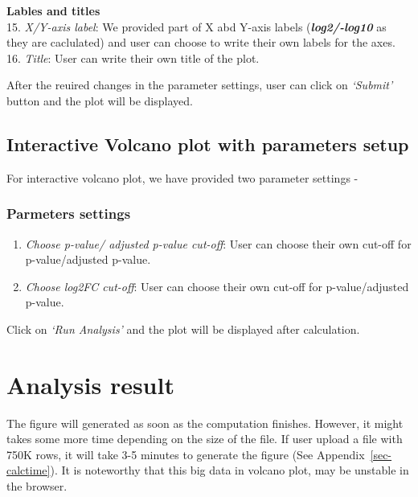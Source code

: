 \documentclass[
  a4paper,
  oneside,
  open=any]{scrreport}
\providecommand{\tightlist}{%
  \setlength{\itemsep}{0pt}\setlength{\parskip}{0pt}}\usepackage{longtable,booktabs,array}
\begin{document}
\textbf{Lables and titles}\\
15. \emph{X/Y-axis label}: We provided part of X abd Y-axis labels
(\textbf{\emph{log2/-log10}} as they are caclulated) and user can choose
to write their own labels for the axes. 16. \emph{Title}: User can write
their own title of the plot.

After the reuired changes in the parameter settings, user can click on
\emph{`Submit'} button and the plot will be displayed.

\hypertarget{interactive-volcano-plot-with-parameters-setup}{%
\subsection{Interactive Volcano plot with parameters
setup}\label{interactive-volcano-plot-with-parameters-setup}}

For interactive volcano plot, we have provided two parameter settings -

\hypertarget{parmeters-settings}{%
\subsubsection{Parmeters settings}\label{parmeters-settings}}

\begin{enumerate}
\def\labelenumi{\arabic{enumi}.}
\tightlist
\item
  \emph{Choose p-value/ adjusted p-value cut-off}: User can choose their
  own cut-off for p-value/adjusted p-value.
\item
  \emph{Choose log2FC cut-off}: User can choose their own cut-off for
  p-value/adjusted p-value.
\end{enumerate}

Click on \emph{`Run Analysis'} and the plot will be displayed after
calculation.

\hypertarget{analysis-result-2}{%
\section{Analysis result}\label{analysis-result-2}}

The figure will generated as soon as the computation finishes. However,
it might takes some more time depending on the size of the file. If user
upload a file with 750K rows, it will take 3-5 minutes to generate the
figure (See Appendix~\ref{sec-calctime}). It is noteworthy that this big
data in volcano plot, may be unstable in the browser.
\end{document}

